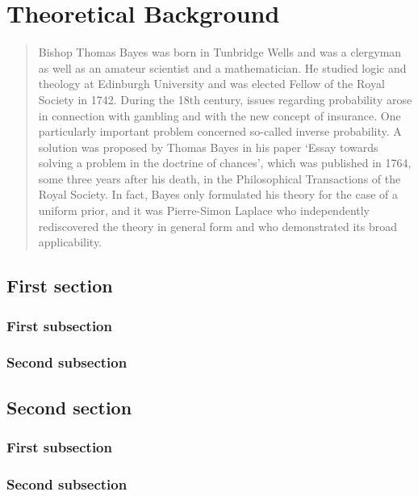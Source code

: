 \chapter{Theoretical Background}\label{chapter:background}
\thispagestyle{chapterBeginStyle}

\begin{quote}{Bishop}
Thomas Bayes was born in Tunbridge Wells and was a clergyman as well as an amateur scientist and a mathematician. He studied logic and theology at Edinburgh University and was elected Fellow of the Royal Society in 1742. During the 18th century, issues regarding probability arose in connection with
gambling and with the new concept of insurance. One particularly important problem concerned so-called inverse probability. A solution was proposed by Thomas Bayes in his paper ‘Essay towards solving a problem in the doctrine of chances’, which was published in 1764, some three years after his death, in the Philosophical Transactions of the Royal Society. In fact, Bayes only formulated his theory for the case of a uniform prior, and it was Pierre-Simon Laplace who independently rediscovered the theory in general form and who demonstrated its broad applicability. \cite{Bishop2006}
\end{quote}

\section{First section}
\subsection{First subsection}
\subsection{Second subsection}

\section{Second section}
\subsection{First subsection}
\subsection{Second subsection}